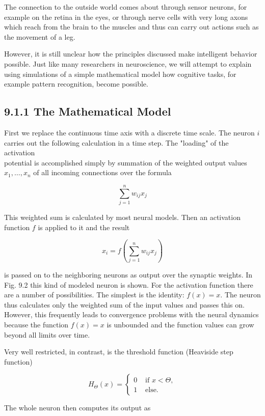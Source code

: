 \documentclass[10pt]{article}
\begin{document}
The connection to the outside world comes about through sensor neurons, for example on the retina in the eyes, or through nerve cells with very long axons which reach from the brain to the muscles and thus can carry out actions such as the movement of a leg.

However, it is still unclear how the principles discussed make intelligent behavior possible. Just like many researchers in neuroscience, we will attempt to explain using simulations of a simple mathematical model how cognitive tasks, for example pattern recognition, become possible.

\subsection*{9.1.1 The Mathematical Model}
First we replace the continuous time axis with a discrete time scale. The neuron $i$ carries out the following calculation in a time step. The "loading" of the activation\\
potential is accomplished simply by summation of the weighted output values $x_{1}, \ldots, x_{n}$ of all incoming connections over the formula


$$
\sum_{j=1}^{n} w_{i j} x_{j}
$$

This weighted sum is calculated by most neural models. Then an activation function $f$ is applied to it and the result

$$
x_{i}=f\left(\sum_{j=1}^{n} w_{i j} x_{j}\right)
$$

is passed on to the neighboring neurons as output over the synaptic weights. In Fig. 9.2 this kind of modeled neuron is shown. For the activation function there are a number of possibilities. The simplest is the identity: $f(x)=x$. The neuron thus calculates only the weighted sum of the input values and passes this on. However, this frequently leads to convergence problems with the neural dynamics because the function $f(x)=x$ is unbounded and the function values can grow beyond all limits over time.

Very well restricted, in contrast, is the threshold function (Heaviside step function)

$$
H_{\Theta}(x)= \begin{cases}0 & \text { if } x<\Theta, \\ 1 & \text { else. }\end{cases}
$$

The whole neuron then computes its output as
\end{document}

